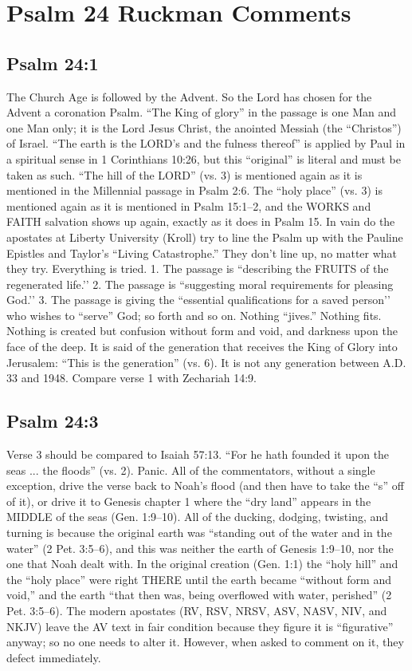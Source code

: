 \section{Psalm 24 Ruckman Comments}

\subsection{Psalm 24:1}
The Church Age is followed by the Advent. So the Lord has chosen for the Advent a coronation Psalm. “The King of glory” in the passage is one Man and one Man only; it is the Lord Jesus Christ, the anointed Messiah (the “Christos”) of Israel. “The earth is the LORD’s and the fulness thereof” is applied by Paul in a spiritual sense in 1 Corinthians 10:26, but this “original” is literal and must be taken as such. “The hill of the LORD” (vs. 3) is mentioned again as it is mentioned in the Millennial passage in Psalm 2:6. The “holy place” (vs. 3) is mentioned again as it is mentioned in Psalm 15:1–2, and the WORKS and FAITH salvation shows up again, exactly as it does in Psalm 15. In vain do the apostates at Liberty University (Kroll) try to line the Psalm up with the Pauline Epistles and Taylor’s “Living Catastrophe.” They don’t line up, no matter what they try. Everything is tried.
1. The passage is “describing the FRUITS of the regenerated life.’’
2. The passage is “suggesting moral requirements for pleasing God.’’
3. The passage is giving the “essential qualifications for a saved person’’ who wishes to “serve” God; so forth and so on.
Nothing “jives.” Nothing fits. Nothing is created but confusion without form and void, and darkness upon the face of the deep. It is said of the generation that receives the King of Glory into Jerusalem: “This is the generation” (vs. 6). It is not any generation between A.D. 33 and 1948. Compare verse 1 with Zechariah 14:9. 



\subsection{Psalm 24:3}

Verse 3 should be compared to Isaiah 57:13. “For he hath founded it upon the seas ... the floods” (vs. 2). Panic. All of the commentators, without a single exception, drive the verse back to Noah’s flood (and then have to take the “s” off of it), or drive it to Genesis chapter 1 where the “dry land” appears in the MIDDLE of the seas (Gen. 1:9--10). All of the ducking, dodging, twisting, and turning is because the original earth was “standing out of the water and in the water” (2 Pet. 3:5--6), and this was neither the earth of Genesis 1:9--10, nor the one that Noah dealt with. In the original creation (Gen. 1:1) the “holy hill” and the “holy place” were right THERE until the earth became “without form and void,” and the earth “that then was, being overflowed with water, perished” (2 Pet. 3:5–6). The modern apostates (RV, RSV, NRSV, ASV, NASV, NIV, and NKJV) leave the AV text in fair condition because they figure it is “figurative” anyway; so no one needs to alter it. However, when asked to comment on it, they defect immediately. 



